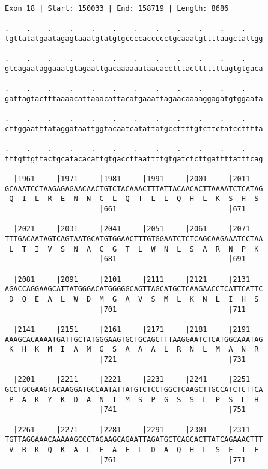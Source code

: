 \documentclass{article}
\begin{document}
\newpage
\begin{Verbatim}
Exon 18 | Start: 150033 | End: 158719 | Length: 8686
 
.    .    .    .    .    .    .    .    .    .    .    .    
tgttatatgaatagagtaaatgtatgtgccccaccccctgcaaatgttttaagctattgg
  
.    .    .    .    .    .    .    .    .    .    .    .    
gtcagaataggaaatgtagaattgacaaaaaataacacctttactttttttagtgtgaca
  
.    .    .    .    .    .    .    .    .    .    .    .    
gattagtactttaaaacattaaacattacatgaaattagaacaaaaggagatgtggaata
  
.    .    .    .    .    .    .    .    .    .    .    .    
cttggaatttataggataattggtacaatcatattatgccttttgtcttctatcctttta
  
.    .    .    .    .    .    .    .    .    .    .    .    
tttgttgttactgcatacacattgtgaccttaattttgtgatctcttgattttatttcag
  
  |1961     |1971     |1981     |1991     |2001     |2011   
GCAAATCCTAAGAGAGAACAACTGTCTACAAACTTTATTACAACACTTAAAATCTCATAG
 Q  I  L  R  E  N  N  C  L  Q  T  L  L  Q  H  L  K  S  H  S 
                      |661                          |671    
  
  |2021     |2031     |2041     |2051     |2061     |2071   
TTTGACAATAGTCAGTAATGCATGTGGAACTTTGTGGAATCTCTCAGCAAGAAATCCTAA
 L  T  I  V  S  N  A  C  G  T  L  W  N  L  S  A  R  N  P  K 
                      |681                          |691    
  
  |2081     |2091     |2101     |2111     |2121     |2131   
AGACCAGGAAGCATTATGGGACATGGGGGCAGTTAGCATGCTCAAGAACCTCATTCATTC
 D  Q  E  A  L  W  D  M  G  A  V  S  M  L  K  N  L  I  H  S 
                      |701                          |711    
  
  |2141     |2151     |2161     |2171     |2181     |2191   
AAAGCACAAAATGATTGCTATGGGAAGTGCTGCAGCTTTAAGGAATCTCATGGCAAATAG
 K  H  K  M  I  A  M  G  S  A  A  A  L  R  N  L  M  A  N  R 
                      |721                          |731    
  
  |2201     |2211     |2221     |2231     |2241     |2251   
GCCTGCGAAGTACAAGGATGCCAATATTATGTCTCCTGGCTCAAGCTTGCCATCTCTTCA
 P  A  K  Y  K  D  A  N  I  M  S  P  G  S  S  L  P  S  L  H 
                      |741                          |751    
  
  |2261     |2271     |2281     |2291     |2301     |2311   
TGTTAGGAAACAAAAAGCCCTAGAAGCAGAATTAGATGCTCAGCACTTATCAGAAACTTT
 V  R  K  Q  K  A  L  E  A  E  L  D  A  Q  H  L  S  E  T  F 
                      |761                          |771    
  

\end{Verbatim}
\end{document}
